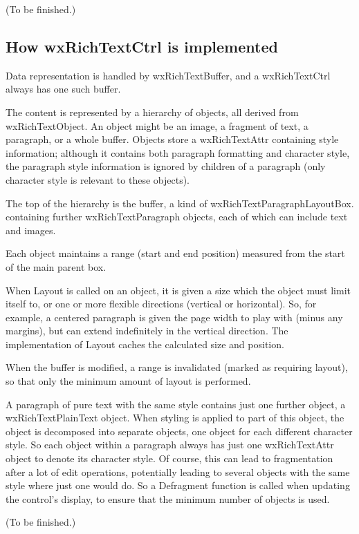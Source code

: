 (To be finished.)

\subsection{How wxRichTextCtrl is implemented}

Data representation is handled by wxRichTextBuffer, and a wxRichTextCtrl
always has one such buffer.

The content is represented by a hierarchy of objects, all derived from
wxRichTextObject. An object might be an image, a fragment of text, a paragraph,
or a whole buffer. Objects store a wxRichTextAttr containing style information;
although it contains both paragraph formatting and character style, the
paragraph style information is ignored by children of a paragraph (only
character style is relevant to these objects).

The top of the hierarchy is the buffer, a kind of wxRichTextParagraphLayoutBox.
containing further wxRichTextParagraph objects, each of which can include text and
images.

Each object maintains a range (start and end position) measured
from the start of the main parent box.

When Layout is called on an object, it is given a size which the object
must limit itself to, or one or more flexible directions (vertical
or horizontal). So, for example, a centered paragraph is given the page
width to play with (minus any margins), but can extend indefinitely
in the vertical direction. The implementation of Layout caches the calculated
size and position.

When the buffer is modified, a range is invalidated (marked as requiring
layout), so that only the minimum amount of layout is performed.

A paragraph of pure text with the same style contains just one further
object, a wxRichTextPlainText object. When styling is applied to part of
this object, the object is decomposed into separate objects, one object
for each different character style. So each object within a paragraph always has
just one wxRichTextAttr object to denote its character style. Of course, this can
lead to fragmentation after a lot of edit operations, potentially leading
to several objects with the same style where just one would do. So
a Defragment function is called when updating the control's display, to ensure that
the minimum number of objects is used.

(To be finished.)

